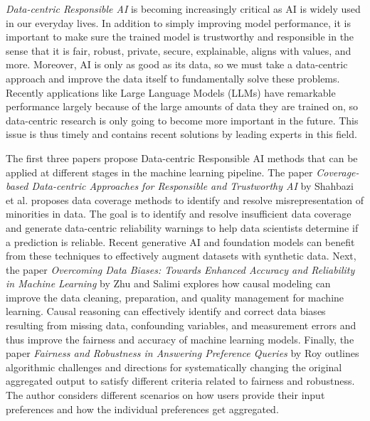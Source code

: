 \documentclass[11pt]{article}
\begin{document}
{\it Data-centric Responsible AI} is becoming increasingly critical as AI is widely used in our everyday lives. In addition to simply improving model performance, it is important to make sure the trained model is trustworthy and responsible in the sense that it is fair, robust, private, secure, explainable, aligns with values, and more. Moreover, AI is only as good as its data, so we must take a data-centric approach and improve the data itself to fundamentally solve these problems. Recently applications like Large Language Models (LLMs) have remarkable performance largely because of the large amounts of data they are trained on, so data-centric research is only going to become more important in the future. This issue is thus timely and contains recent solutions by leading experts in this field.

The first three papers propose Data-centric Responsible AI methods that can be applied at different stages in the machine learning pipeline. The paper {\it Coverage-based Data-centric Approaches for
Responsible and Trustworthy AI} by Shahbazi et al. proposes data coverage methods to identify and resolve misrepresentation of minorities in data. The goal is to identify and resolve insufficient data coverage and generate data-centric reliability warnings to help data scientists determine if a prediction is reliable. Recent generative AI and foundation models can benefit from these techniques to effectively augment datasets with synthetic data. 
Next, the paper {\it Overcoming Data Biases: Towards Enhanced Accuracy and Reliability in Machine Learning} by Zhu and Salimi explores how causal modeling can improve the data cleaning, preparation, and quality management for machine learning. Causal reasoning can effectively identify and correct data biases resulting from missing data, confounding variables, and measurement errors and thus improve the fairness and accuracy of machine learning models.
Finally, the paper {\it Fairness and Robustness in Answering Preference Queries} by Roy outlines algorithmic challenges and directions for systematically changing the original aggregated output to satisfy different criteria related to fairness and robustness. The author considers different scenarios on how users provide their input preferences and how the individual preferences get aggregated.
\end{document}
